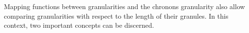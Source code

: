 %
%
%
%
%

Mapping functions between granularities and the chronons granularity also allow comparing granularities with respect to the length of their granules. In this context, two important concepts can be discerned.

